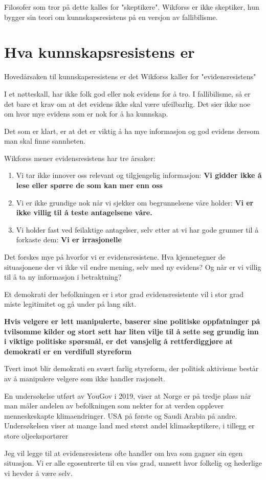 \documentclass[11pt]{article}
\begin{document}
\vspace{1em}
Filosofer som tror på dette kalles for "skeptikere". Wikforss er ikke skeptiker, hun bygger sin teori om kunnskapsresistens på en versjon av fallibilisme.


\section{Hva kunnskapsresistens er}


Hovedårsaken til kunnskapsresistens er det Wikforss kaller for "evidensresistens"

I et nøtteskall, har ikke folk god eller nok evidens for å tro. I fallibilisme, så er det bare et krav om at det evidens ikke skal være ufeilbarlig. Det sier ikke noe om hvor mye evidens som er nok for å ha kunnskap.

\vspace{1em}
Det som er klart, er at det er viktig å ha mye informasjon og god evidens dersom man skal finne sannheten.

Wikforss mener evidensresistens har tre årsaker:

\begin{enumerate}
    \item Vi tar ikke innover oss relevant og tilgjengelig informasjon: \textbf{Vi gidder ikke å lese eller spørre de som kan mer enn oss}
    \item Vi er ikke grundige nok når vi sjekker om begrunnelsene våre holder: \textbf{Vi er ikke villig til å teste antagelsene våre.}
    \item Vi holder fast ved feilaktige antagelser, selv etter at vi har gode grunner til å forkaste dem: \textbf{Vi er irrasjonelle}
\end{enumerate}



Det forskes mye på hvorfor vi er evidensresistene. Hva kjennetegner de situasjonene der vi ikke vil endre mening, selv med ny evidens? Og når er vi villig til å ta ny informasjon i betraktning?

Et demokrati der befolkningen er i stor grad evidensresistente vil i stor grad miste legitimitet og gå under på lang sikt. 

\textbf{Hvis velgere er lett manipulerte, baserer sine politiske oppfatninger på tvilsomme kilder og stort sett har liten vilje til å sette seg grundig inn i viktige politiske spørsmål, er det vansjelig å rettferdiggjøre at demokrati er en verdifull styreform}

Tvert imot blir demokrati en svært farlig styreform, der politisk aktivisme består av å manipulere velgere som ikke handler rasjonelt.


En undersøkelse utført av YouGov i 2019, viser at Norge er på tredje plass når man måler andelen av befolkningen som nekter for at verden opplever menneskeskapte klimaendringer. USA på første og Saudi Arabia på andre. Undersøkelsen viser at mange land med størst andel klimaskeptikere, i tillegg er store oljeeksportører


\vspace{1em}
Jeg vil legge til at evidensresistens ofte handler om hva som gagner sin egen situasjon. Vi er alle egosentrerte til en viss grad, uansett hvor folkelig og hederlige vi hevder å være selv. 
\end{document}
